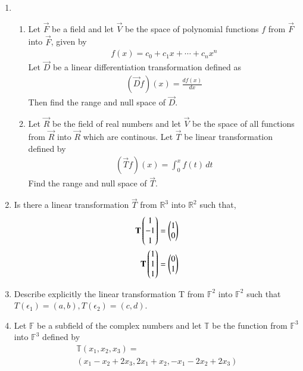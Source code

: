 \begin{enumerate}[label=\thesubsection.\arabic*.,ref=\thesubsection.\theenumi]
\item \begin{enumerate}[label=\emph{\alph*)}]
\item
Let $\vec{F}$ be a field and let $\vec{V}$ be the space of polynomial functions $f$ from $\vec{F}$
into $\vec{F}$, given by
\begin{align*}
	f(x)=c_0+c_1x+\cdots +c_nx^n
\end{align*}
Let $\vec{D}$ be a linear differentiation transformation defined as
\begin{align*}
	(\vec{D}f)(x)=\frac{df(x)}{dx}
\end{align*}
Then find the range and null space of 
$\vec{D}$.\\
\item
Let $\vec{R}$ be the field of real numbers and let $\vec{V}$ be the space of all functions from 
$\vec{R}$ into $\vec{R}$ which are continous. Let $\vec{T}$ be linear transformation defined by
\begin{align*}
	(\vec{T}f)(x)=\int_{0}^{x} f(t)\,dt
\end{align*}
Find the range and null space of $\vec{T}$.
\end{enumerate}
%
\solution

%
\item  Is there a linear transformation $\vec{T}$ from $\mathbb{R}^3$ into $\mathbb{R}^2$ such that,
 \begin{align}
 \mathbf{T}\begin{pmatrix}1\\ -1\\ 1\end{pmatrix} & = \begin{pmatrix}1\\0\end{pmatrix}\label{eq:solutions/3/1/4/g1}\\
 \mathbf{T}\begin{pmatrix}1\\ 1\\1\end{pmatrix} &= \begin{pmatrix}0\\ 1\end{pmatrix}\label{eq:solutions/3/1/4/g2}
 \end{align}
%
\solution

%
\item Describe explicitly the linear transformation T from $\mathbb{F}^2$ into $\mathbb{F}^2$ such that  $T(\epsilon_1 )=(a,b),T(\epsilon_2 )=(c,d)$.
%
\solution

%
\item Let $\mathbb{F}$ be a subfield of the complex numbers and let $\mathbb{T}$ be the function from $\mathbb{F}^3$ into $\mathbb{F}^3$ defined by 
\begin{align}
    \mathbb{T}(x_1,x_2,x_3)=\\(x_1-x_2+2x_3,2x_1+x_2,-x_1-2x_2+2x_3)
\end{align}

\end{enumerate}
